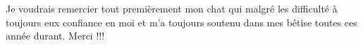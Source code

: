 Je voudrais remercier tout premièrement mon chat qui malgré les difficulté à toujours eux confiance en moi et m'a toujours soutenu dans mes bêtise toutes ces année durant.
Merci !!!